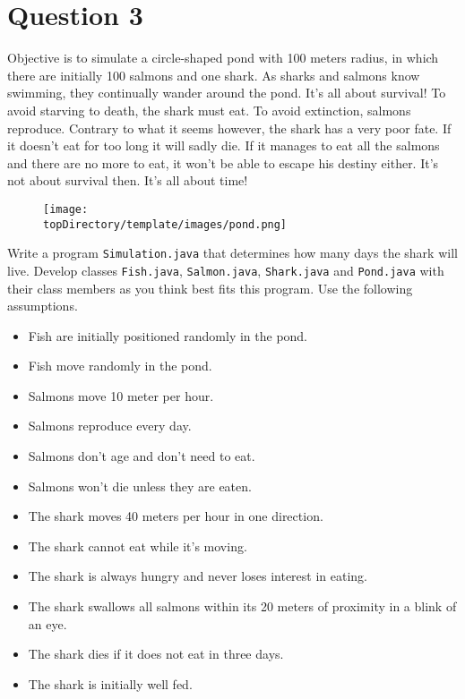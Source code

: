 \section*{Question 3}

Objective is to simulate a circle-shaped pond with 100 meters radius, in which there are initially 100 salmons and one shark. As sharks and salmons know swimming, they continually wander around the pond. It's all about survival! To avoid starving to death, the shark must eat. To avoid extinction, salmons reproduce. Contrary to what it seems however, the shark has a very poor fate. If it doesn't eat for too long it will sadly die. If it manages to eat all the salmons and there are no more to eat, it won't be able to escape his destiny either. It's not about survival then. It's all about time!
\begin{figure}[H]\centering
\texttt{[image: \\topDirectory/template/images/pond.png]}
\end{figure}

Write a program \texttt{Simulation.java} that determines how many days the shark will live. Develop classes \texttt{Fish.java}, \texttt{Salmon.java}, \texttt{Shark.java} and \texttt{Pond.java} with their class members as you think best fits this program. Use the following assumptions.
\begin{itemize}[itemsep=1mm] \parskip=0pt \parsep=0pt
\item[] Fish are initially positioned randomly in the pond.
\item[] Fish move randomly in the pond.
\item[] Salmons move 10 meter per hour.
\item[] Salmons reproduce every day.
\item[] Salmons don't age and don't need to eat.
\item[] Salmons won't die unless they are eaten.
\item[] The shark moves 40 meters per hour in one direction.
\item[] The shark cannot eat while it's moving.
\item[] The shark is always hungry and never loses interest in eating.
\item[] The shark swallows all salmons within its 20 meters of proximity in a blink of an eye.
\item[] The shark dies if it does not eat in three days.
\item[] The shark is initially well fed.
\end{itemize}
